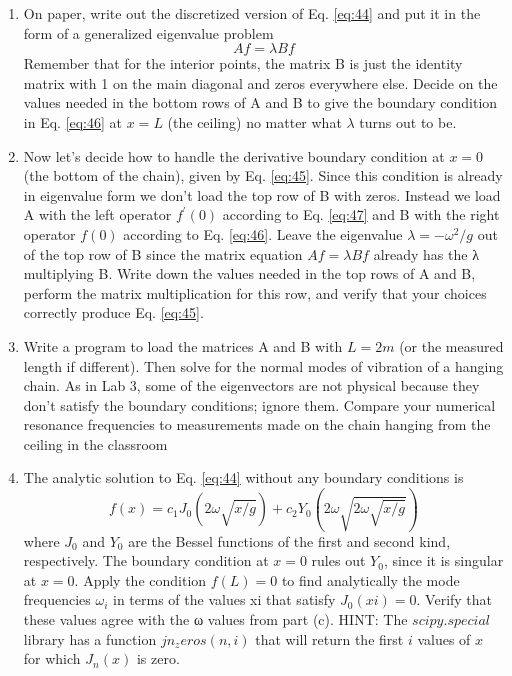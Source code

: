 \begin{problem} \label{P4.2}
				\begin{enumerate}[label=(\alph*)]
			\item	On paper, write out the discretized version of Eq. \ref{eq:44} and put it in
the form of a generalized eigenvalue problem
\begin{equation}\label{eq:48}
		Af = \lambda B f
				\end{equation}
					Remember that for the interior points, the matrix B is just the identity
matrix with 1 on the main diagonal and zeros everywhere else. Decide on the values needed in the bottom rows of A and B to give the
boundary condition in Eq. \ref{eq:46} at $x = L$ (the ceiling) no matter what
$\lambda$ turns out to be.
\item Now let\rq s decide how to handle the derivative boundary condition at
$x = 0$ (the bottom of the chain), given by Eq. \ref{eq:45}. Since this condition
is already in eigenvalue form we don\rq t load the top row of B with zeros.
Instead we load A with the left operator $f^\prime (0)$ according to Eq. \ref{eq:47}
and B with the right operator $f(0)$  according to Eq. \ref{eq:46}. Leave the
eigenvalue $ \lambda = − \omega ^ 2
/g$ out of the top row of B since the matrix equation
$Af = \lambda Bf$ already has the λ multiplying B. Write down the values
needed in the top rows of A and B, perform the matrix multiplication
for this row, and verify that your choices correctly produce Eq. \ref{eq:45}.
\item Write a program to load the matrices A and B with $L = 2 m$ (or the measured length if different). Then solve for the normal modes of vibration
of a hanging chain. As in Lab 3, some of the eigenvectors are not physical because they don\rq t satisfy the boundary conditions; ignore them.
Compare your numerical resonance frequencies to measurements
made on the chain hanging from the ceiling in the classroom
\item The analytic solution to Eq. \ref{eq:44} without any boundary conditions is
\begin{equation*}
		f(x) = c_1J_0(2\omega \sqrt{x / g}) + c_2 Y_0(2\omega \sqrt{2\omega \sqrt{x / g}})
				\end{equation*}
				where $J_0$ and $Y_0$ are the Bessel functions of the first and second kind,
respectively. The boundary condition at $x = 0$ rules out $Y_0$, since it is
singular at $x = 0$. Apply the condition $f(L) = 0$ to find analytically the
mode frequencies $ \omega_i$
in terms of the values xi that satisfy $J_0(xi) = 0$.
Verify that these values agree with the ω values from part (c).
HINT: The $scipy.special$ library has a function $jn_zeros(n,i)$
that will return the first $i$ values of $x$ for which $J_n(x)$ is zero.
				\end{enumerate}
			\end{problem}		

